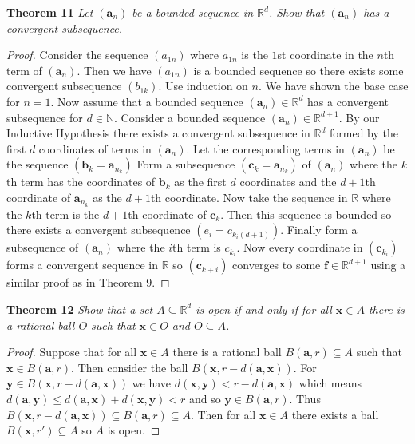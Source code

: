\documentclass{article}
\begin{document}
\begin{flushleft}
\textbf{Theorem 11}
\textsl{Let $(\mathbf{a}_n)$ be a bounded sequence in $\mathbb{R}^d$. Show that $(\mathbf{a}_n)$ has a convergent subsequence.}
\begin{proof}
Consider the sequence $(a_{1n})$ where $a_{1n}$ is the $1$st coordinate in the $n$th term of $(\mathbf{a}_n)$. Then we have $(a_{1n})$ is a bounded sequence so there exists some convergent subsequence $(b_{1k})$. Use induction on $n$. We have shown the base case for $n=1$. Now assume that a bounded sequence $(\mathbf{a}_n) \in \mathbb{R}^d$ has a convergent subsequence for $d \in \mathbb{N}$. Consider a bounded sequence $(\mathbf{a}_n) \in \mathbb{R}^{d+1}$. By our Inductive Hypothesis there exists a convergent subsequence in $\mathbb{R}^d$ formed by the first $d$ coordinates of terms in $(\mathbf{a}_n)$. Let the corresponding terms in $(\mathbf{a}_n)$ be the sequence $(\mathbf{b}_k = \mathbf{a}_{n_k})$  Form a subsequence $(\mathbf{c}_k = \mathbf{a}_{n_k})$ of $(\mathbf{a}_n)$ where the $k$th term has the coordinates of $\mathbf{b}_k$ as the first $d$ coordinates and the $d+1$th coordinate of $\mathbf{a}_{n_k}$ as the $d+1$th coordinate. Now take the sequence in $\mathbb{R}$ where the $k$th term is the $d+1$th coordinate of $\mathbf{c}_k$. Then this sequence is bounded so there exists a convergent subsequence $(e_i = c_{k_i (d+1)})$. Finally form a subsequence of $(\mathbf{a}_n)$ where the $i$th term is $c_{k_i}$. Now every coordinate in $(\mathbf{c}_{k_i})$ forms a convergent sequence in $\mathbb{R}$ so $(\mathbf{c}_{k+i})$ converges to some $\mathbf{f} \in \mathbb{R}^{d+1}$ using a similar proof as in Theorem 9.
\end{proof}

\textbf{Theorem 12}
\textsl{Show that a set $A \subseteq \mathbb{R}^d$ is open if and only if for all $\mathbf{x} \in A$ there is a rational ball $O$ such that $\mathbf{x} \in O$ and $O \subseteq A$.}
\begin{proof}
Suppose that for all $\mathbf{x} \in A$ there is a rational ball $B(\mathbf{a}, r) \subseteq A$ such that $\mathbf{x} \in B(\mathbf{a}, r)$. Then consider the ball $B(\mathbf{x}, r-d(\mathbf{a}, \mathbf{x}))$. For $\mathbf{y} \in B(\mathbf{x}, r-d(\mathbf{a}, \mathbf{x}))$ we have $d(\mathbf{x}, \mathbf{y}) < r-d(\mathbf{a}, \mathbf{x})$ which means $d(\mathbf{a}, \mathbf{y}) \leq d(\mathbf{a}, \mathbf{x}) + d(\mathbf{x}, \mathbf{y}) < r$ and so $\mathbf{y} \in B(\mathbf{a}, r)$. Thus $B(\mathbf{x}, r-d(\mathbf{a}, \mathbf{x})) \subseteq B(\mathbf{a}, r) \subseteq A$. Then for all $\mathbf{x} \in A$ there exists a ball $B(\mathbf{x}, r') \subseteq A$ so $A$ is open.\newline


\end{proof}
\end{flushleft}
\end{document}
